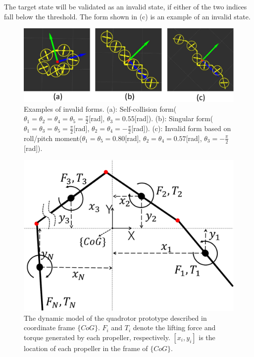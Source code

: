 \par
The target state will be validated as an invalid state, if either of the two indices fall below the threshold. The form shown in (c) is an example of an invalid state.

\begin{figure}[th]
  \begin{center}
    \includegraphics[width=1.0\columnwidth]{figs/invalid_forms.pdf}
  \end{center}
  \caption{Examples of invalid forms. \newline
(a): Self-collision form($\theta_1=\theta_2=\theta_4=\theta_5=\frac{\pi}{2}$[rad], $\theta_3=0.55$[rad]). \newline (b): Singular form($\theta_1=\theta_3=\theta_5=\frac{\pi}{2}$[rad], $\theta_2=\theta_4=-\frac{\pi}{2}$[rad]). \newline (c): Invalid form based on roll/pitch moment($\theta_1=\theta_5=0.80$[rad], $\theta_2=\theta_4=0.57$[rad], $\theta_3=-\frac{\pi}{2}$[rad]).\label{figure:invalid_forms}}
\end{figure}

\begin{figure}[th]
  \begin{center}
    \includegraphics[width=0.9\columnwidth]{figs/dynamic_model.pdf}
    \caption{The dynamic model of the quadrotor prototype described in coordinate frame $\{CoG\}$. $F_i$ and $T_i$ denote the lifting force and torque generated by each propeller, respectively. $[x_i, y_i]$ is the location of each propeller in the frame of $\{CoG\}$.\label{figure:dynamic_model}}
  \end{center}
\end{figure}

